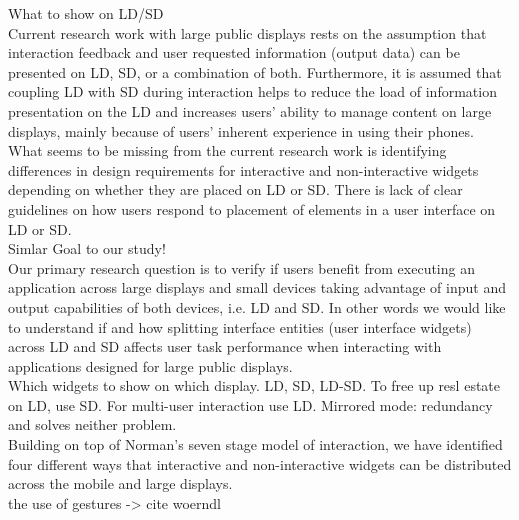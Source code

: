 What to show on LD/SD\\
Current research work with large public displays rests on the assumption that
interaction feedback and user requested information (output data) can be
presented on LD, SD, or a combination of both. Furthermore, it is assumed that
coupling LD with SD during interaction helps to reduce the load of information presentation on the LD and increases users’ ability to manage content on large displays, mainly because of users’ inherent experience in using their phones. What seems to be missing from the current research work is identifying differences in design requirements for interactive and non-interactive widgets depending on whether they are placed on LD or SD. There is lack of clear guidelines on how users respond to placement of elements in a user interface on LD or SD.\\

Simlar Goal to our study!\\
Our primary research question is to verify if users benefit from executing an
application across large displays and small devices taking advantage of input
and output capabilities of both devices, i.e. LD and SD. In other words we would
like to understand if and how splitting interface entities (user interface widgets) across LD and SD affects user task performance when interacting with applications designed for large public displays.\\

Which widgets to show on which display. LD, SD, LD-SD. To free up resl estate on
LD, use SD.
For multi-user interaction use LD. Mirrored mode: redundancy and solves neither
problem.\\
Building on top of Norman’s seven stage model of interaction, we have identified
four different ways that interactive and non-interactive widgets can be
distributed across the mobile and large displays.\\


the use of gestures -> cite woerndl\\


